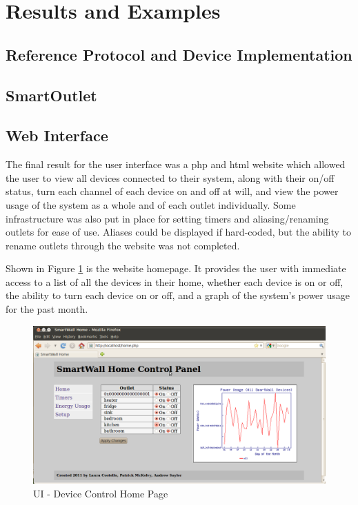\documentclass[12pt]{article}
\begin{document}
\section{Results and Examples}

\subsection{Reference Protocol and Device Implementation}







\subsection{SmartOutlet}

\subsection{Web Interface}

The final result for the user interface was a php and html website
which allowed the user to view all devices connected to their system,
along with their on/off status, turn each channel of each device on
and off at will, and view the power usage of the system as a whole
and of each outlet individually. Some infrastructure was also put in
place for setting timers and aliasing/renaming outlets for ease of
use. Aliases could be displayed if hard-coded, but the ability to
rename outlets through the website was not completed.

Shown in Figure \ref{fig:webUI-home} is the website homepage. It provides the
user with immediate access to a list of all the devices in their
home, whether each device is on or off, the ability to turn each
device on or off, and a graph of the system’s power usage for the
past month. 

\begin{figure}
  \begin{center}
    \includegraphics[scale=.3]{webUI-home.png}
  \end{center}
  \caption{UI - Device Control Home Page}
  \label{fig:webUI-home}
\end{figure}
\end{document}
